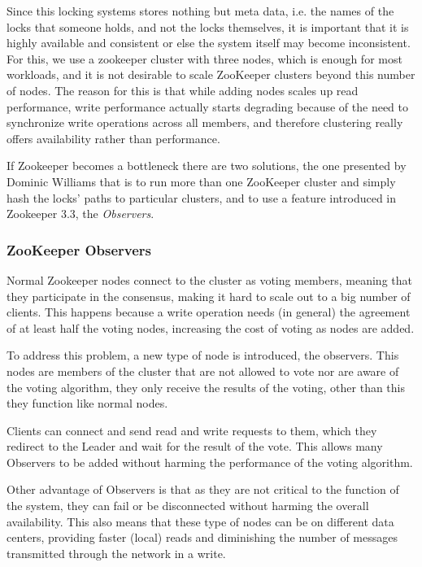 Since this locking systems stores nothing but meta data, i.e. the names of the locks that someone holds, and not the locks themselves, it is important that it is highly available and consistent or else the system itself may become inconsistent. For this, we use a zookeeper cluster with three nodes, which is enough for most workloads\cite{zooPerf}, and it is not desirable to scale ZooKeeper clusters beyond this number of nodes. The reason for this is that while adding nodes scales up read performance, write performance actually starts degrading because of the need to synchronize write operations across all members, and therefore clustering really offers availability rather than performance. 

If Zookeeper becomes a bottleneck there are two solutions, the one presented by Dominic Williams that is to run more than one ZooKeeper cluster and simply hash the locks' paths to particular clusters, and to use a feature introduced in Zookeeper 3.3, the \emph{Observers}.  

\subsubsection{ZooKeeper Observers}
Normal Zookeeper nodes connect to the cluster as voting members, meaning that they participate in the consensus, making it hard to scale out to a big number of clients. This happens because a write operation needs (in general) the agreement of at least half the voting nodes, increasing the cost of voting as nodes are added.

To address this problem, a new type of node is introduced, the observers. This nodes are members of the cluster that are not allowed to vote nor are aware of the voting algorithm, they only receive the results of the voting, other than this they function like normal nodes. 

Clients can connect and send read and write requests to them, which they redirect to the Leader and wait for the result of the vote. This allows many Observers to be added without harming the performance of the voting algorithm.

Other advantage of Observers is that as they are not critical to the function of the system, they can fail or be disconnected without harming the overall availability. This also means that these type of nodes can be on different data centers, providing faster (local) reads and diminishing the number of messages transmitted through the network in a write. \\ 

